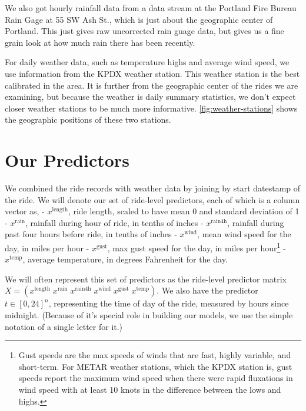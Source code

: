 \documentclass[12pt,twoside]{reedthesis}
\begin{document}
  We also got hourly rainfall data from a data stream at the Portland Fire
  Bureau Rain Gage at 55 SW Ash St., which is just about the geographic
  center of Portland. This just gives raw uncorrected rain guage data, but
  gives us a fine grain look at how much rain there has been recently.
  
  For daily weather data, such as temperature highs and average wind
  speed, we use information from the KPDX weather station. This weather
  station is the best calibrated in the area. It is further from the
  geographic center of the rides we are examining, but because the weather
  is daily summary statistics, we don't expect closer weather stations to
  be much more informative. \autoref{fig:weather-stations} shows the
  geographic positions of these two stations.
  
  \section{Our Predictors}\label{our-predictors}
  
  We combined the ride records with weather data by joining by start
  datestamp of the ride. We will denote our set of ride-level predictors,
  each of which is a column vector as, - \(x^\text{length}\), ride length,
  scaled to have mean 0 and standard deviation of 1 - \(x^\text{rain}\),
  rainfall during hour of ride, in tenths of inches - \(x^\text{rain4h}\),
  rainfall during past four hours before ride, in tenths of inches -
  \(x^\text{wind}\), mean wind speed for the day, in miles per hour -
  \(x^\text{gust}\), max gust speed for the day, in miles per
  hour\footnote{Gust speeds are the max speeds of winds that are fast,
    highly variable, and short-term. For METAR weather stations, which the
    KPDX station is, gust speeds report the maximum wind speed when there
    were rapid fluxations in wind speed with at least 10 knots in the
    difference between the lows and highs.} - \(x^\text{temp}\), average
  temperature, in degrees Fahrenheit for the day.
  
  We will often represent this set of predictors as the ride-level
  predictor matrix
  \(X = (x^\text{length} \; x^\text{rain} \; x^\text{rain4h} \; x^\text{wind} \; x^\text{gust}\; x^\text{temp}).\)
  We also have the predictor \(t \in [0, 24]^n\), representing the time of
  day of the ride, measured by hours since midnight. (Because of it's
  special role in building our models, we use the simple notation of a
  single letter for it.)
  
\end{document}
